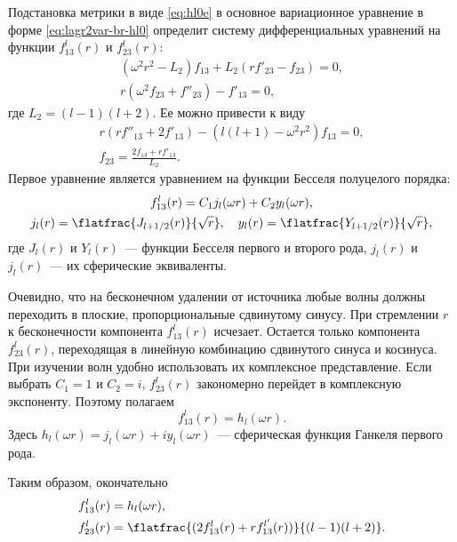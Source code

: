 \documentclass[\docroot/reports/draft/report.tex]{subfiles}
\begin{document}
    Подстановка метрики в виде \autoref{eq:hl0e} в основное вариационное уравнение в форме \autoref{eq:lagr2var-br-hl0} определит систему дифференциальных уравнений на функции $f^l_{13}(r)$ и $f^l_{23}(r)$:
    \begin{equation*}\begin{gathered}
        (\omega^2 r^2 - L_2) f_{13} + L_2 (r f'_{23} - f_{23}) = 0, \\
        r (\omega^2 f_{23} + f''_{23}) - f'_{13} = 0,
    \end{gathered}\end{equation*}
    где $L_2 = (l-1)(l+2)$. Ее можно привести к виду
    \begin{equation*}\begin{gathered}
        r (r f''_{13} + 2 f'_{13}) - (l(l+1) - \omega^2 r^2) f_{13} = 0, \\
        f_{23} = \frac{2 f_{13} + r f'_{13}}{L_2}.
    \end{gathered}\end{equation*}
    Первое уравнение является уравнением на функции Бесселя полуцелого порядка:
    \begin{equation*}\begin{gathered}
        f^l_{13}(r) = C_1 j_l(\omega r) + C_2 y_l(\omega r), \\
        j_l(r) = \flatfrac{J_{l+1/2}(r)}{\sqrt{r}}, \quad
        y_l(r) = \flatfrac{Y_{l+1/2}(r)}{\sqrt{r}},
    \end{gathered}\end{equation*}
    где $J_l(r)$ и $Y_l(r)$~--- функции Бесселя первого и второго рода, $j_l(r)$ и $j_l(r)$~--- их сферические эквиваленты.

    Очевидно, что на бесконечном удалении от источника любые волны должны переходить в плоские, пропорциональные сдвинутому синусу. При стремлении $r$ к бесконечности компонента $f^l_{13}(r)$ исчезает. Остается только компонента $f^l_{23}(r)$, переходящая в линейную комбинацию сдвинутого синуса и косинуса. При изучении волн удобно использовать их комплексное представление. Если выбрать $C_1 = 1$ и $C_2 = i$, $f^l_{23}(r)$ закономерно перейдет в комплексную экспоненту. Поэтому полагаем
    \begin{equation*}
        f^l_{13}(r) = h_l(\omega r).
    \end{equation*}
    Здесь $h_l(\omega r) = j_l(\omega r) + i y_l(\omega r)$~--- сферическая функция Ганкеля первого рода.

    Таким образом, окончательно
    \begin{equation}\begin{aligned}\label{hl0o-f}
        f^l_{13}(r) &= h_l(\omega r), \\
        f^l_{23}(r) &= \flatfrac{(2 f^l_{13}(r) + r f^{l{'}}_{13}(r))}{(l-1)(l+2)}.
    \end{aligned}\end{equation}
\end{document}
